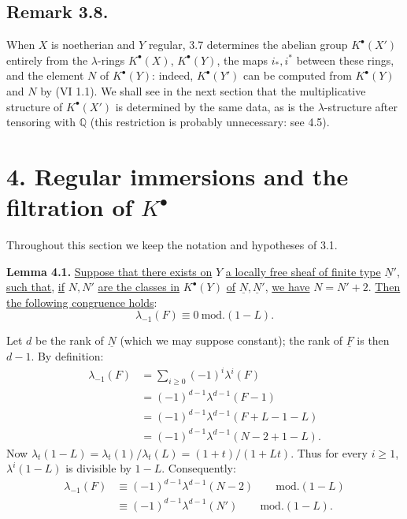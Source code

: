 %
\subsection*{Remark 3.8.}

When \(X\) is noetherian and \(Y\) regular, 3.7 determines the abelian group \(K^{\bullet}(X')\) entirely from the \(\lambda\)-rings \(K^{\bullet}(X)\), \(K^{\bullet}(Y)\), the maps \(i_*,i^*\) between these rings, and the element \(N\) of \(K^{\bullet}(Y)\): indeed, \(K^{\bullet}(Y')\) can be computed from \(K^{\bullet}(Y)\) and \(N\) by (VI 1.1). We shall see in the next section that the multiplicative structure of \(K^{\bullet}(X')\) is determined by the same data, as is the \(\lambda\)-structure after tensoring with \(\mathbb Q\) (this restriction is probably unnecessary: see 4.5).

\section*{4. Regular immersions and the filtration of \(K^{\bullet}\)}

Throughout this section we keep the notation and hypotheses of 3.1.

\textbf{Lemma 4.1.} \uline{Suppose that there exists on} \(Y\) \uline{a locally free sheaf of finite type} \(\underline{N}'\), \uline{such that}, \uline{if} \(N,N'\) \uline{are the classes in} \(K^{\bullet}(Y)\) \uline{of} \(\underline{N},\underline{N}'\), \uline{we have} \(N=N'+2\). \uline{Then the following congruence holds}:
\[
  \lambda_{-1}(F)\equiv 0 \ \mathrm{mod.}(1-L).
\]

Let \(d\) be the rank of \(\underline{N}\) (which we may suppose constant); the rank of \(\underline{F}\) is then \(d-1\). By definition:
\[
\begin{aligned}
\lambda_{-1}(F)
 &= \sum_{i\ge0}(-1)^i\lambda^i(F)\\
 &= (-1)^{d-1}\lambda^{d-1}(F-1)\\
 &= (-1)^{d-1}\lambda^{d-1}(F+L-1-L)\\
 &= (-1)^{d-1}\lambda^{d-1}(N-2+1-L).
\end{aligned}
\]
Now \(\lambda_t(1-L)=\lambda_t(1)/\lambda_t(L)=(1+t)/(1+Lt)\). Thus for every \(i\ge1\), \(\lambda^i(1-L)\) is divisible by \(1-L\). Consequently:
\[
\begin{aligned}
\lambda_{-1}(F)
  &\equiv (-1)^{d-1}\lambda^{d-1}(N-2) \qquad\mathrm{mod.}(1-L)\\
  &\equiv(-1)^{d-1}\lambda^{d-1}(N') \qquad\mathrm{mod.}(1-L).
\end{aligned}
\]

